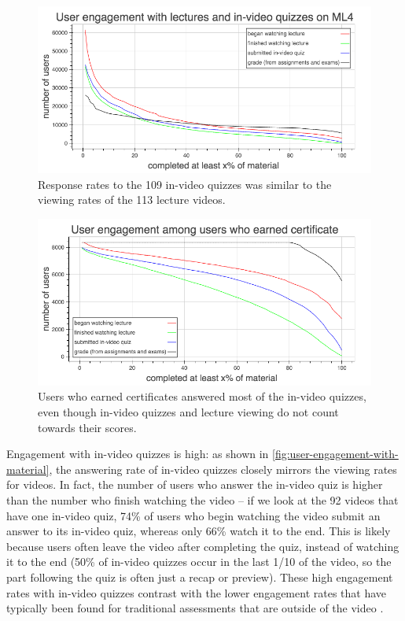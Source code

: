 \documentclass{sigchi}
\begin{document}
\begin{figure}
\includegraphics[width=1.0\columnwidth]{user-engagement-with-material}
\caption{Response rates to the 109 in-video quizzes was similar to the viewing rates of the 113 lecture videos.}
\label{fig:user-engagement-with-material}
\end{figure}

\begin{figure}
\includegraphics[width=1.0\columnwidth]{user-engagement-certificate}
\caption{Users who earned certificates answered most of the in-video quizzes, even though in-video quizzes and lecture viewing do not count towards their scores.}
\label{fig:user-engagement-certificate}
\end{figure}

Engagement with in-video quizzes is high: as shown in \autoref{fig:user-engagement-with-material}, the answering rate of in-video quizzes closely mirrors the viewing rates for videos. In fact, the number of users who answer the in-video quiz is higher than the number who finish watching the video -- if we look at the 92 videos that have one in-video quiz, 74\% of users who begin watching the video submit an answer to its in-video quiz, whereas only 66\% watch it to the end. This is likely because users often leave the video after completing the quiz, instead of watching it to the end (50\% of in-video quizzes occur in the last 1/10 of the video, so the part following the quiz is often just a recap or preview). These high engagement rates with in-video quizzes contrast with the lower engagement rates that have typically been found for traditional assessments that are outside of the video \cite{renedisengagement} \cite{ashton}.
\end{document}
